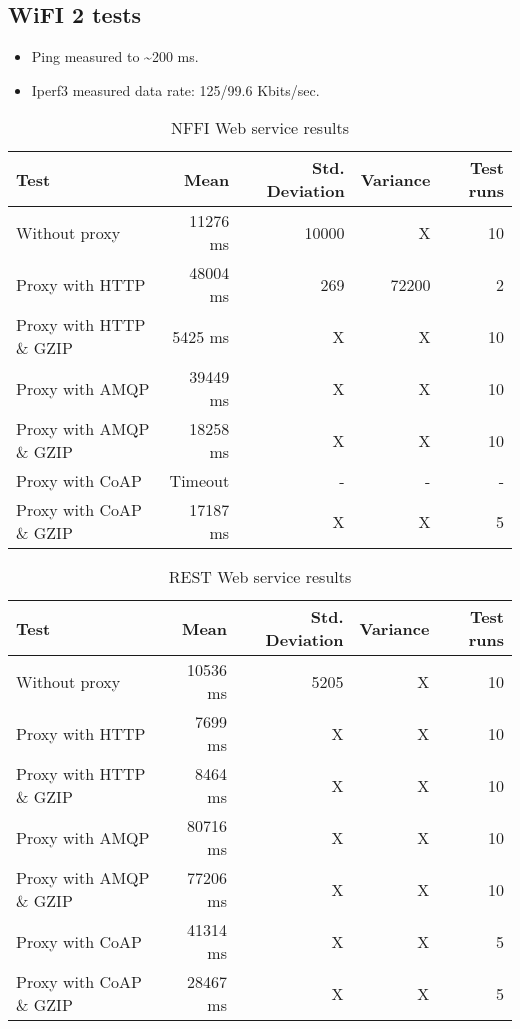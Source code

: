 \begin{appendices}
\section{WiFI 2 tests}

\begin{itemize}
	\item Ping measured to \textasciitilde 200 ms.
	\item Iperf3 measured data rate: 125/99.6 Kbits/sec.
\end{itemize}

\begin{table}[H]
\begin{tabular}{| l | r | r | r | r |}
\hline
  \textbf{Test} & \textbf{Mean} & \textbf{Std. Deviation} & \textbf{Variance} & \textbf{Test runs}\\ \hline
  Without proxy & 11276 ms & 10000 & X & 10 \\ \hline
  Proxy with HTTP & 48004 ms & 269 & 72200 & 2 \\ \hline
  Proxy with HTTP \& GZIP & 5425 ms & X & X & 10 \\ \hline
  Proxy with AMQP & 39449 ms & X & X & 10 \\ \hline
  Proxy with AMQP \& GZIP & 18258 ms & X & X & 10\\ \hline
  Proxy with CoAP & Timeout & - & - & - \\ \hline
  Proxy with CoAP \& GZIP & 17187 ms & X & X & 5 \\ \hline
\end{tabular}
\caption{NFFI Web service results}
\end{table}


\begin{table}[H]
\begin{tabular}{| l | r | r | r | r |}
\hline
  \textbf{Test} & \textbf{Mean} & \textbf{Std. Deviation} & \textbf{Variance} & \textbf{Test runs}\\ \hline
  Without proxy & 10536 ms & 5205 & X & 10 \\ \hline
  Proxy with HTTP & 7699 ms & X & X & 10 \\ \hline
  Proxy with HTTP \& GZIP & 8464 ms & X & X & 10 \\ \hline
  Proxy with AMQP & 80716 ms & X & X & 10 \\ \hline
  Proxy with AMQP \& GZIP & 77206 ms & X & X & 10\\ \hline
  Proxy with CoAP & 41314 ms & X & X & 5 \\ \hline
  Proxy with CoAP \& GZIP & 28467 ms & X & X & 5 \\ \hline
\end{tabular}
\caption{REST Web service results}
\end{table}



\end{appendices}
